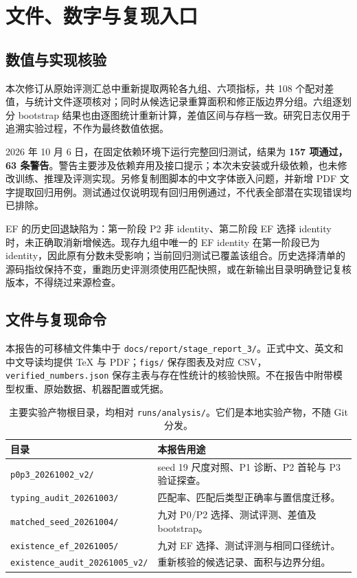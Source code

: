 \documentclass[11pt,a4paper,UTF8,fontset=fandol]{ctexart}
\newcommand{\code}[1]{\nolinkurl{#1}}
\begin{document}
\appendix
\section{文件、数字与复现入口}

\subsection{数值与实现核验}

本次修订从原始评测汇总中重新提取两轮各九组、六项指标，共 108 个配对差值，与统计文件逐项核对；同时从候选记录重算面积和修正版边界分组。六组逐划分 bootstrap 结果也由逐图统计重新计算，差值区间与存档一致。研究日志\cite{findings}仅用于追溯实验过程，不作为最终数值依据。

2026 年 10 月 6 日，在固定依赖环境下运行完整回归测试，结果为 \textbf{157 项通过，63 条警告}。警告主要涉及依赖弃用及接口提示；本次未安装或升级依赖，也未修改训练、推理及评测实现。另修复制图脚本的中文字体嵌入问题，并新增 PDF 文字提取回归用例。测试通过仅说明现有回归用例通过，不代表全部潜在实现错误均已排除。

EF 的历史回退缺陷为：第一阶段 P2 非 identity、第二阶段 EF 选择 identity 时，未正确取消新增候选。现存九组中唯一的 EF identity 在第一阶段已为 identity，因此原有分数未受影响；当前回归测试已覆盖该组合。历史选择清单的源码指纹保持不变，重跑历史评测须使用匹配快照，或在新输出目录明确登记复核版本，不得绕过来源检查。

\subsection{文件与复现命令}

本报告的可移植文件集中于 \code{docs/report/stage_report_3/}。正式中文、英文和中文导读均提供 TeX 与 PDF；\code{figs/} 保存图表及对应 CSV，\code{verified_numbers.json} 保存主表与存在性统计的核验快照。不在报告中附带模型权重、原始数据、机器配置或凭据。

\begin{table}[H]
\centering\footnotesize
\caption{主要实验产物根目录，均相对 \code{runs/analysis/}。它们是本地实验产物，不随 Git 分发。}
\begin{tabularx}{\linewidth}{lY}\toprule
目录 & 本报告用途\\\midrule
\code{p0p3_20261002_v2/} & seed 19 尺度对照、P1 诊断、P2 首轮与 P3 验证探查。\\
\code{typing_audit_20261003/} & 匹配率、匹配后类型正确率与置信度迁移。\\
\code{matched_seed_20261004/} & 九对 P0/P2 选择、测试评测、差值及 bootstrap。\\
\code{existence_ef_20261005/} & 九对 EF 选择、测试评测与相同口径统计。\\
\code{existence_audit_20261005_v2/} & 重新核验的候选记录、面积与边界分组。\\\bottomrule
\end{tabularx}
\end{table}
\end{document}
